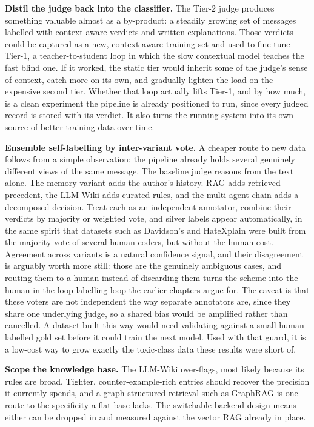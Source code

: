 \textbf{Distil the judge back into the classifier.} The Tier-2 judge produces something valuable almost as a by-product: a steadily growing set of messages labelled with context-aware verdicts and written explanations. Those verdicts could be captured as a new, context-aware training set and used to fine-tune Tier-1, a teacher-to-student loop in which the slow contextual model teaches the fast blind one. If it worked, the static tier would inherit some of the judge's sense of context, catch more on its own, and gradually lighten the load on the expensive second tier. Whether that loop actually lifts Tier-1, and by how much, is a clean experiment the pipeline is already positioned to run, since every judged record is stored with its verdict. It also turns the running system into its own source of better training data over time.

\textbf{Ensemble self-labelling by inter-variant vote.} A cheaper route to new data follows from a simple observation: the pipeline already holds several genuinely different views of the same message. The baseline judge reasons from the text alone. The memory variant adds the author's history. RAG adds retrieved precedent, the LLM-Wiki adds curated rules, and the multi-agent chain adds a decomposed decision. Treat each as an independent annotator, combine their verdicts by majority or weighted vote, and silver labels appear automatically, in the same spirit that datasets such as Davidson's \citep{davidson2017} and HateXplain \citep{hatexplain2021} were built from the majority vote of several human coders, but without the human cost. Agreement across variants is a natural confidence signal, and their disagreement is arguably worth more still: those are the genuinely ambiguous cases, and routing them to a human instead of discarding them turns the scheme into the human-in-the-loop labelling loop the earlier chapters argue for. The caveat is that these voters are not independent the way separate annotators are, since they share one underlying judge, so a shared bias would be amplified rather than cancelled. A dataset built this way would need validating against a small human-labelled gold set before it could train the next model. Used with that guard, it is a low-cost way to grow exactly the toxic-class data these results were short of.

\textbf{Scope the knowledge base.} The LLM-Wiki over-flags, most likely because its rules are broad. Tighter, counter-example-rich entries should recover the precision it currently spends, and a graph-structured retrieval such as GraphRAG is one route to the specificity a flat base lacks. The switchable-backend design means either can be dropped in and measured against the vector RAG already in place.

